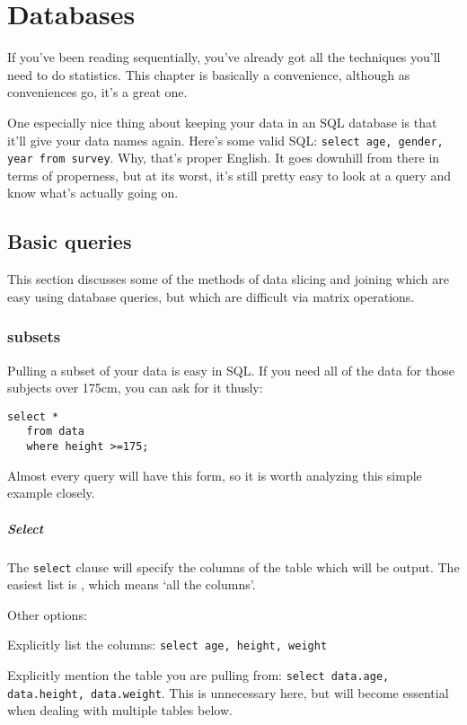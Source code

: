 \chapter{Databases} \label{sql}

If you've been reading sequentially, you've already got all the techniques you'll need to do statistics.
This chapter is basically a convenience, although as conveniences go, it's a great one. 

One especially nice thing about keeping your data in an SQL database is
that it'll give your data names again. Here's some valid SQL: {\tt select age, gender, year from
survey}. Why, that's proper English. It goes downhill from there in terms of properness, but at its worst,
it's still pretty easy to look at a query and know what's actually going on.

\section{Basic queries}
This section discusses some of the methods of data slicing and joining
which are easy using database queries, but which are difficult via
matrix operations.

\subsection{subsets} Pulling a subset of your data is easy in SQL. If
you need all of the data for those subjects over 175cm, you can ask for
it thusly:

\begin{verbatim}
select * 
   from data 
   where height >=175;
\end{verbatim}

Almost every query will have this form, so it is worth analyzing this
simple example closely.

\paragraph{Select}
The {\tt select} clause will specify the columns of the table which will
be output. The easiest list is {\tt *}, which means `all the columns'.

Other options:

Explicitly list the columns: {\tt select age, height, weight}

Explicitly mention the table you are pulling from: {\tt select data.age,
data.height, data.weight}. This is unnecessary here, but will become
essential when dealing with multiple tables below.

